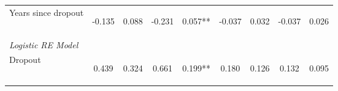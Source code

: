 \begin{center}
\begin{tabular}{lcccccccc}
\hspace{1em} Years since dropout & \begin{bf}-0.135\end{bf} & \begin{bf}0.088\end{bf} & \begin{rm}-0.231\end{rm} & \begin{rm}0.057**\end{rm} & \begin{bf}-0.037\end{bf} & \begin{bf}0.032\end{bf} & \begin{rm}-0.037\end{rm} & \begin{rm}0.026\end{rm}\\
\textit{Logistic RE Model} & \begin{bf}\end{bf} & \begin{bf}\end{bf} & \begin{rm}\end{rm} & \begin{rm}\end{rm} & \begin{bf}\end{bf} & \begin{bf}\end{bf} & \begin{rm}\end{rm} & \begin{rm}\end{rm}\\
\hspace{1em} Dropout & \begin{bf}0.439\end{bf} & \begin{bf}0.324\end{bf} & \begin{rm}0.661\end{rm} & \begin{rm}0.199**\end{rm} & \begin{bf}0.180\end{bf} & \begin{bf}0.126\end{bf} & \begin{rm}0.132\end{rm} & \begin{rm}0.095\end{rm}\\

\end{tabular}
\end{center}
